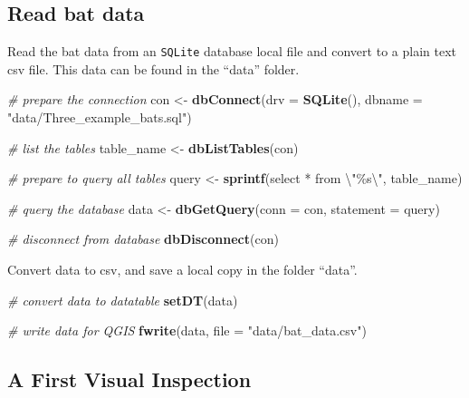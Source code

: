 \documentclass[
]{scrartcl}
\newenvironment{Shaded}{}{}
\newcommand{\CharTok}[1]{\textcolor[rgb]{0.25,0.44,0.63}{#1}}
\newcommand{\CommentTok}[1]{\textcolor[rgb]{0.38,0.63,0.69}{\textit{#1}}}
\newcommand{\DataTypeTok}[1]{\textcolor[rgb]{0.56,0.13,0.00}{#1}}
\newcommand{\KeywordTok}[1]{\textcolor[rgb]{0.00,0.44,0.13}{\textbf{#1}}}
\newcommand{\NormalTok}[1]{#1}
\newcommand{\StringTok}[1]{\textcolor[rgb]{0.25,0.44,0.63}{#1}}
\begin{document}
\hypertarget{read-bat-data}{%
\subsection{Read bat data}\label{read-bat-data}}

Read the bat data from an \texttt{SQLite} database local file and convert to a plain text csv file.
This data can be found in the ``data'' folder.

\begin{Shaded}
\begin{Highlighting}[]
\CommentTok{\# prepare the connection}
\NormalTok{con <{-}}\StringTok{ }\KeywordTok{dbConnect}\NormalTok{(}\DataTypeTok{drv =} \KeywordTok{SQLite}\NormalTok{(), }
                 \DataTypeTok{dbname =} \StringTok{"data/Three\_example\_bats.sql"}\NormalTok{)}

\CommentTok{\# list the tables}
\NormalTok{table\_name <{-}}\StringTok{ }\KeywordTok{dbListTables}\NormalTok{(con)}

\CommentTok{\# prepare to query all tables}
\NormalTok{query <{-}}\StringTok{ }\KeywordTok{sprintf}\NormalTok{(}\StringTok{\textquotesingle{}select * from }\CharTok{\textbackslash{}"}\StringTok{\%s}\CharTok{\textbackslash{}"}\StringTok{\textquotesingle{}}\NormalTok{, table\_name)}

\CommentTok{\# query the database}
\NormalTok{data <{-}}\StringTok{ }\KeywordTok{dbGetQuery}\NormalTok{(}\DataTypeTok{conn =}\NormalTok{ con, }\DataTypeTok{statement =}\NormalTok{ query)}

\CommentTok{\# disconnect from database}
\KeywordTok{dbDisconnect}\NormalTok{(con)}
\end{Highlighting}
\end{Shaded}

Convert data to csv, and save a local copy in the folder ``data''.

\begin{Shaded}
\begin{Highlighting}[]
\CommentTok{\# convert data to datatable}
\KeywordTok{setDT}\NormalTok{(data)}

\CommentTok{\# write data for QGIS}
\KeywordTok{fwrite}\NormalTok{(data, }\DataTypeTok{file =} \StringTok{"data/bat\_data.csv"}\NormalTok{)}
\end{Highlighting}
\end{Shaded}

\hypertarget{a-first-visual-inspection}{%
\subsection{A First Visual Inspection}\label{a-first-visual-inspection}}
\end{document}
